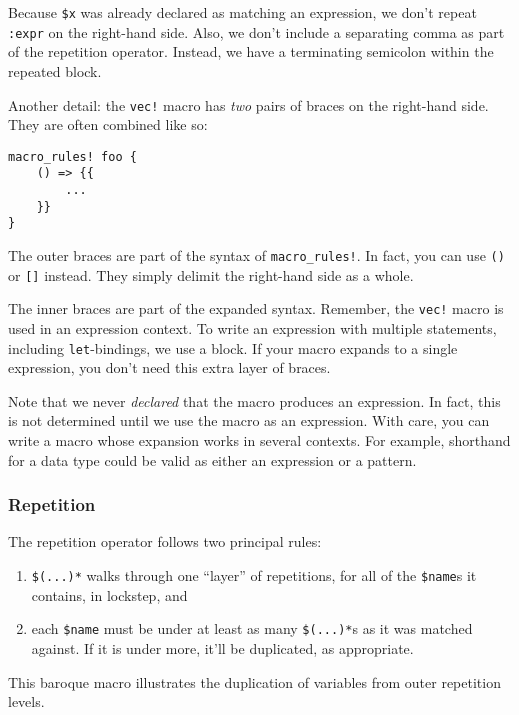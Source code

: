 \documentclass[a4paper,]{book}
\begin{document}
Because \texttt{\$x} was already declared as matching an expression, we
don't repeat \texttt{:expr} on the right-hand side. Also, we don't
include a separating comma as part of the repetition operator. Instead,
we have a terminating semicolon within the repeated block.

Another detail: the \texttt{vec!} macro has \emph{two} pairs of braces
on the right-hand side. They are often combined like so:

\begin{verbatim}
macro_rules! foo {
    () => {{
        ...
    }}
}
\end{verbatim}

The outer braces are part of the syntax of \texttt{macro\_rules!}. In
fact, you can use \texttt{()} or \texttt{{[}{]}} instead. They simply
delimit the right-hand side as a whole.

The inner braces are part of the expanded syntax. Remember, the
\texttt{vec!} macro is used in an expression context. To write an
expression with multiple statements, including \texttt{let}-bindings, we
use a block. If your macro expands to a single expression, you don't
need this extra layer of braces.

Note that we never \emph{declared} that the macro produces an
expression. In fact, this is not determined until we use the macro as an
expression. With care, you can write a macro whose expansion works in
several contexts. For example, shorthand for a data type could be valid
as either an expression or a pattern.

\subsubsection{Repetition}\label{repetition}

The repetition operator follows two principal rules:

\begin{enumerate}
\def\labelenumi{\arabic{enumi}.}
\itemsep1pt\parskip0pt
\item
  \texttt{\$(...)*} walks through one ``layer'' of repetitions, for all
  of the \texttt{\$name}s it contains, in lockstep, and
\item
  each \texttt{\$name} must be under at least as many \texttt{\$(...)*}s
  as it was matched against. If it is under more, it'll be duplicated,
  as appropriate.
\end{enumerate}

This baroque macro illustrates the duplication of variables from outer
repetition levels.
\end{document}
